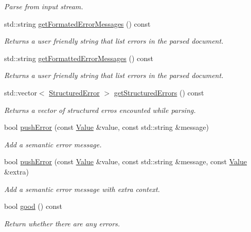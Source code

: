 \begin{DoxyCompactItemize}
\begin{DoxyCompactList}\small\item\em Parse from input stream. \end{DoxyCompactList}\item 
std\+::string \hyperlink{class_json_1_1_reader_a269793929575f925b629460c9c744da1}{get\+Formated\+Error\+Messages} () const
\begin{DoxyCompactList}\small\item\em Returns a user friendly string that list errors in the parsed document. \end{DoxyCompactList}\item 
std\+::string \hyperlink{class_json_1_1_reader_a5e624688f0794da1e737d2a15aa5cb84}{get\+Formatted\+Error\+Messages} () const
\begin{DoxyCompactList}\small\item\em Returns a user friendly string that list errors in the parsed document. \end{DoxyCompactList}\item 
std\+::vector$<$ \hyperlink{struct_json_1_1_reader_1_1_structured_error}{Structured\+Error} $>$ \hyperlink{class_json_1_1_reader_ae3d714e95bd98b27e296c607e408189b}{get\+Structured\+Errors} () const
\begin{DoxyCompactList}\small\item\em Returns a vector of structured erros encounted while parsing. \end{DoxyCompactList}\item 
bool \hyperlink{class_json_1_1_reader_ade6c28e0ef00d8f2e0aa2283f91c3e37}{push\+Error} (const \hyperlink{class_json_1_1_value}{Value} \&value, const std\+::string \&message)
\begin{DoxyCompactList}\small\item\em Add a semantic error message. \end{DoxyCompactList}\item 
bool \hyperlink{class_json_1_1_reader_a9b474233c3a7c688e340e70665d45223}{push\+Error} (const \hyperlink{class_json_1_1_value}{Value} \&value, const std\+::string \&message, const \hyperlink{class_json_1_1_value}{Value} \&extra)
\begin{DoxyCompactList}\small\item\em Add a semantic error message with extra context. \end{DoxyCompactList}\item 
bool \hyperlink{class_json_1_1_reader_a86cbb42b3e6d4a4d6416473b1a8f6ae7}{good} () const
\begin{DoxyCompactList}\small\item\em Return whether there are any errors. \end{DoxyCompactList}\end{DoxyCompactItemize}


